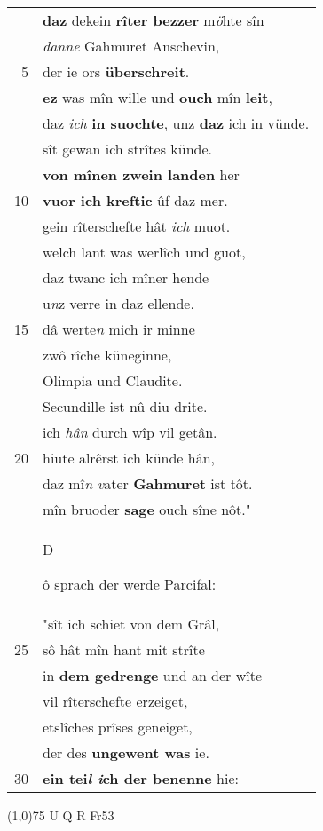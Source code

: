 \documentclass[8pt,a4paper,notitlepage]{article}
\begin{document}
\begin{table}[ht]
\begin{minipage}[t]{0.5\linewidth}
\begin{tabular}{rl}
 & \textbf{daz} dekein \textbf{rîter bezzer} m\textit{ö}hte sîn\\ 
 & \textit{danne} Gahmuret Anschevin,\\ 
5 & der ie ors \textbf{überschreit}.\\ 
 & \textbf{ez} was mîn wille und \textbf{ouch} mîn \textbf{leit},\\ 
 & daz \textit{ich} \textbf{in suochte}, unz \textbf{daz} ich in vünde.\\ 
 & sît gewan ich strîtes künde.\\ 
 & \textbf{von mînen zwein landen} her\\ 
10 & \textbf{vuor ich kreftic} ûf daz mer.\\ 
 & gein rîterschefte hât \textit{ich} muot.\\ 
 & welch lant was werlîch und guot,\\ 
 & daz twanc ich mîner hende\\ 
 & u\textit{n}z verre in daz ellende.\\ 
15 & dâ werte\textit{n} mich ir minne\\ 
 & zwô rîche küneginne,\\ 
 & Olimpia und Claudite.\\ 
 & Secundille ist nû diu drite.\\ 
 & ich \textit{hân} durch wîp vil getân.\\ 
20 & hiute alrêrst ich künde hân,\\ 
 & daz mî\textit{n v}ater \textbf{Gahmuret} ist tôt.\\ 
 & mîn bruoder \textbf{sage} ouch sîne nôt."\\ 
 & \begin{large}D\end{large}ô sprach der werde Parcifal:\\ 
 & "sît ich schiet von dem Grâl,\\ 
25 & sô hât mîn hant mit strîte\\ 
 & in \textbf{dem gedrenge} und an der wîte\\ 
 & vil rîterschefte erzeiget,\\ 
 & etslîches prîses geneiget,\\ 
 & der des \textbf{ungewent was} ie.\\ 
30 & \textbf{ein tei\textit{l i}ch der benenne} hie:\\ 
\end{tabular}
\scriptsize
\line(1,0){75} \newline
U Q R Fr53 \newline

\end{minipage}
\end{table}
\end{document}
